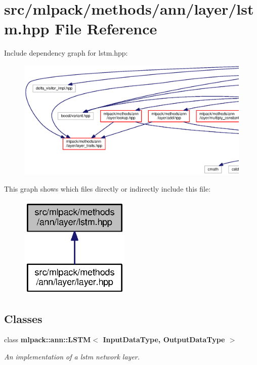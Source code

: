 \section{src/mlpack/methods/ann/layer/lstm.hpp File Reference}
\label{lstm_8hpp}
Include dependency graph for lstm.\+hpp\+:
\nopagebreak
\begin{figure}[H]
\begin{center}
\leavevmode
\includegraphics[width=350pt]{lstm_8hpp__incl}
\end{center}
\end{figure}
This graph shows which files directly or indirectly include this file\+:
\nopagebreak
\begin{figure}[H]
\begin{center}
\leavevmode
\includegraphics[width=149pt]{lstm_8hpp__dep__incl}
\end{center}
\end{figure}
\subsection*{Classes}
\begin{DoxyCompactItemize}
\item 
class {\bf mlpack\+::ann\+::\+L\+S\+T\+M$<$ Input\+Data\+Type, Output\+Data\+Type $>$}
\begin{DoxyCompactList}\small\item\em An implementation of a lstm network layer. \end{DoxyCompactList}\end{DoxyCompactItemize}
